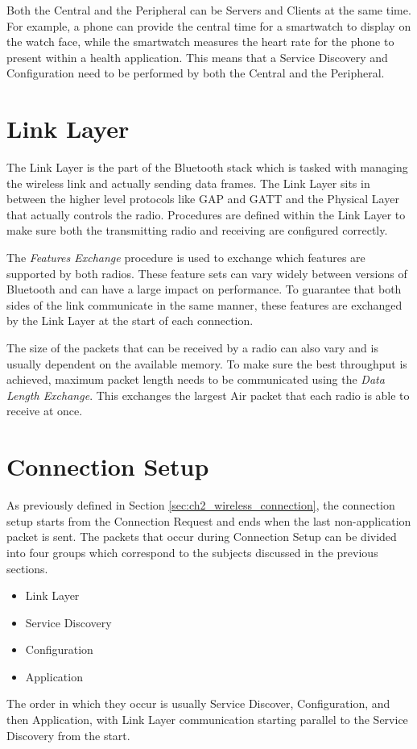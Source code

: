Both the Central and the Peripheral can be Servers and Clients at the same time. For example, a phone can provide the central time for a smartwatch to display on the watch face, while the smartwatch measures the heart rate for the phone to present within a health application. This means that a Service Discovery and Configuration need to be performed by both the Central and the Peripheral.

\section{Link Layer}
The Link Layer is the part of the Bluetooth stack which is tasked with managing the wireless link and actually sending data frames. The Link Layer sits in between the higher level protocols like GAP and GATT and the Physical Layer that actually controls the radio.
Procedures are defined within the Link Layer to make sure both the transmitting radio and receiving are configured correctly.

The \textit{Features Exchange} procedure is used to exchange which features are supported by both radios. These feature sets can vary widely between versions of Bluetooth and can have a large impact on performance. To guarantee that both sides of the link communicate in the same manner, these features are exchanged by the Link Layer at the start of each connection.

The size of the packets that can be received by a radio can also vary and is usually dependent on the available memory. To make sure the best throughput is achieved, maximum packet length needs to be communicated using the \textit{Data Length Exchange}. This exchanges the largest Air packet that each radio is able to receive at once.

\section{Connection Setup}
As previously defined in Section \ref{sec:ch2_wireless_connection}, the connection setup starts from the Connection Request and ends when the last non-application packet is sent. The packets that occur during Connection Setup can be divided into four groups which correspond to the subjects discussed in the previous sections.
\begin{itemize}
    \item Link Layer
    \item Service Discovery
    \item Configuration
    \item Application
\end{itemize} 
The order in which they occur is usually Service Discover, Configuration, and then Application, with Link Layer communication starting parallel to the Service Discovery from the start.

